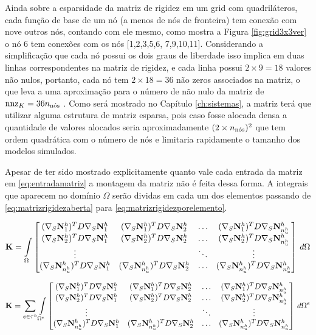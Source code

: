 Ainda sobre a esparsidade da matriz de rigidez em um grid com quadriláteros, cada função de base de um nó (a menos de nós de fronteira) tem conexão com nove outros nós, contando com ele mesmo, como mostra a Figura \ref{fig:grid3x3ver} o nó 6 tem conexões com os nós [1,2,3,5,6, 7,9,10,11]. Considerando a simplificação que cada nó possui os dois graus de liberdade isso implica em duas linhas correspondentes na matriz de rigidez, e cada linha possui $2 \times 9 = 18$ valores não nulos, portanto, cada nó tem $2 \times 18 = 36$ não zeros associados na matriz, o que leva a uma aproximação para o número de não nulo da matriz de $\text{nnz}_K = 36 \qtdnos$ . Como será mostrado no Capítulo \ref{ch:sistemas}, a matriz terá que utilizar alguma estrutura de matriz esparsa, pois caso fosse alocada densa a quantidade de valores alocados seria aproximadamente $(2 \times \qtdnos)^2$ que tem ordem quadrática com o número de nós e limitaria rapidamente o tamanho dos modelos simulados.


Apesar de ter sido mostrado explicitamente quanto vale cada entrada da matriz em \eqref{eq:entradamatriz} a montagem da matriz não é feita dessa forma. A integrais que aparecem no domínio $\Omega$ serão dividas em cada um dos elementos passando de \eqref{eq:matrizrigidezaberta} para \eqref{eq:matrizrigidezporelemento}.

\begin{equation}\label{eq:matrizrigidezaberta}
\mathbf{K}  = \omeint{
\begin{bmatrix}
\kij{1}{1} & \kij{1}{2}  & \hdots & \kij{1}{\qtdfreedomfine} \\
\kij{2}{1} & \kij{2}{2}  & \hdots & \kij{2}{\qtdfreedomfine} \\
\vdots &  & \ddots & \vdots\\
\kij{\qtdfreedomfine}{1} & \kij{\qtdfreedomfine}{2}  & \hdots & \kij{\qtdfreedomfine}{\qtdfreedomfine}
\end{bmatrix}
}
\end{equation}


\begin{equation}\label{eq:matrizrigidezporelemento}
\mathbf{K}  = \sum_{e \in \tau^h} \omeeint{
\begin{bmatrix}
\kij{1}{1} & \kij{1}{2}  & \hdots & \kij{1}{\qtdfreedomfine} \\
\kij{2}{1} & \kij{2}{2}  & \hdots & \kij{2}{\qtdfreedomfine} \\
\vdots     &             & \ddots & \vdots\\
\kij{\qtdfreedomfine}{1} & \kij{\qtdfreedomfine}{2}  & \hdots & \kij{\qtdfreedomfine}{\qtdfreedomfine}
\end{bmatrix}
}
\end{equation}


